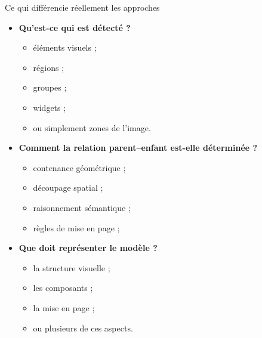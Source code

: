 \documentclass[aspectratio=169,11pt]{beamer}
\begin{document}
\begin{frame}{Ce qui différencie réellement les approches}
\begin{itemize}
  \item \textbf{Qu'est-ce qui est détecté ?}
  \begin{itemize}
    \item éléments visuels ;
    \item régions ;
    \item groupes ;
    \item widgets ;
    \item ou simplement zones de l'image.
  \end{itemize}
  \item \textbf{Comment la relation parent--enfant est-elle déterminée ?}
  \begin{itemize}
    \item contenance géométrique ;
    \item découpage spatial ;
    \item raisonnement sémantique ;
    \item règles de mise en page ;
  \end{itemize}
  \item \textbf{Que doit représenter le modèle ?}
  \begin{itemize}
    \item la structure visuelle ;
    \item les composants ;
    \item la mise en page ;
    \item ou plusieurs de ces aspects.
  \end{itemize}
\end{itemize}
\end{frame}
\end{document}
